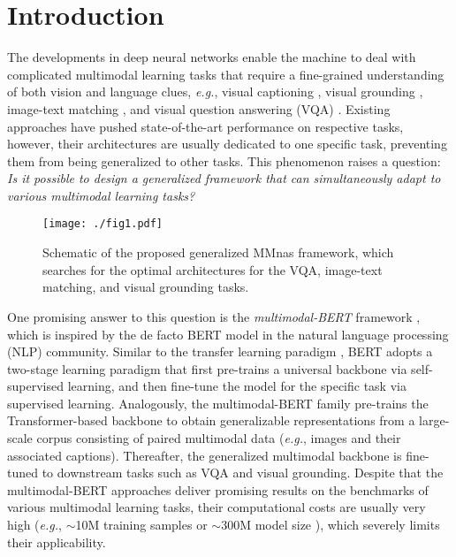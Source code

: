 \documentclass[sigconf]{acmart}
\begin{document}



\maketitle

\section{Introduction}
The developments in deep neural networks enable the machine to deal with complicated multimodal learning tasks that require a fine-grained understanding of both vision and language clues, \emph{e.g.}, visual captioning \cite{xu2015show, anderson2017up-down}, visual grounding \cite{rohrbach2016grounding, yu2018mattnet}, image-text matching \cite{kim2018bilinear, nam2017dual}, and visual question answering (VQA) \cite{fukui2016multimodal, yu2017mfb}. Existing approaches have pushed state-of-the-art performance on respective tasks, however, their architectures are usually dedicated to one specific task, preventing them from being generalized to other tasks. This phenomenon raises a question: \emph{Is it possible to design a generalized framework that can simultaneously adapt to various multimodal learning tasks?}

\begin{figure}
\begin{center}
\texttt{[image: ./fig1.pdf]}
\caption{Schematic of the proposed generalized MMnas framework, which searches for the optimal architectures for the VQA,  image-text matching, and visual grounding tasks.}
\label{fig:example}
\end{center}
\end{figure}

One promising answer to this question is the \emph{multimodal-BERT} framework \cite{tan2019lxmert, chen2019uniter, lu2019vilbert, li2019visualbert}, which is inspired by the de facto BERT model \cite{devlin2019bert} in the natural language processing (NLP) community. Similar to the transfer learning paradigm \cite{zamir2018taskonomy, tang2016generalized}, BERT adopts a two-stage learning paradigm that first pre-trains a universal backbone via self-supervised learning, and then fine-tune the model for the specific task via supervised learning. Analogously, the multimodal-BERT family pre-trains the Transformer-based backbone to obtain generalizable representations from a large-scale corpus consisting of paired multimodal data (\emph{e.g.}, images and their associated captions). Thereafter, the generalized multimodal backbone is fine-tuned to downstream tasks such as VQA and visual grounding. Despite that the multimodal-BERT approaches deliver promising results on the benchmarks of various multimodal learning tasks, their computational costs are usually very high (\emph{e.g.}, $\sim$10M training samples \cite{tan2019lxmert} or $\sim$300M model size \cite{lu2019vilbert, chen2019uniter}), which severely limits their applicability.
\end{document}
